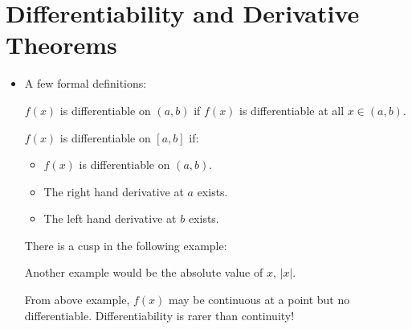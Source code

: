 \section{Differentiability and Derivative Theorems}
\begin{itemize}
    \item A few formal definitions:
    \begin{definition}
        $f(x)$ is differentiable on $(a,b)$ if $f(x)$ is differentiable at all $x\in (a,b)$.
    \end{definition}
    \begin{definition}
        $f(x)$ is differentiable on $[a,b]$ if:
        \begin{itemize}
            \item $f(x)$ is differentiable on $(a,b)$.
            \item The right hand derivative at $a$ exists.
            \item The left hand derivative at $b$ exists.
        \end{itemize}
    \end{definition}
    \begin{example}
    There is a cusp in the following example:
    \begin{center}
    \end{center}
    Another example would be the absolute value of $x$, $|x|$.
    \end{example}
    \begin{warning}
        From above example, $f(x)$ may be continuous at a point but no differentiable. Differentiability is rarer than continuity!
    \end{warning}
    \begin{theorem}

\end{theorem}
\end{itemize}
